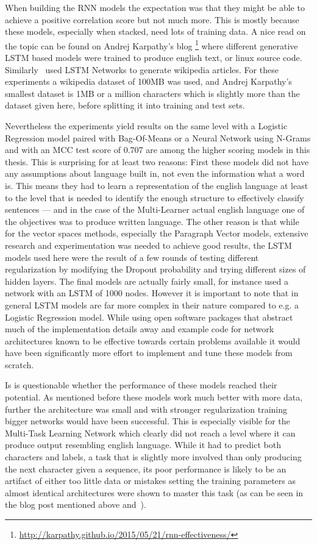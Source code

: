 When building the \gls{RNN} models the expectation was that they might be able to achieve a positive correlation score but not much more. This is mostly because these models, especially when stacked, need lots of training data. A nice read on the topic can be found on Andrej Karpathy's blog \footnote{\url{http://karpathy.github.io/2015/05/21/rnn-effectiveness/}} where different generative LSTM based models were trained to produce english text, or linux source code. Similarly~\cite{Graves:2013aa} used LSTM Networks to generate wikipedia articles. For these experiments a wikipedia dataset of 100MB was used, and Andrej Karpathy's smallest dataset is 1MB or a million characters which is slightly more than the dataset given here, before splitting it into training and test sets.

Nevertheless the experiments yield results on the same level with a Logistic Regression model paired with Bag-Of-Means or a Neural Network using N-Grams and  with an \gls{MCC} test score of 0.707 are among the higher scoring models in this thesis. This is surprising for at least two reasons: First these models did not have any assumptions about language built in, not even the information what a word is. This means they had to learn a representation of the english language at least to the level that is needed to identify the enough structure to effectively classify sentences --- and in the case of the Multi-Learner actual english language one of the objectives was to produce written language.
The other reason is that while for the vector spaces methods, especially the Paragraph Vector models, extensive research and experimentation was needed to achieve good results, the LSTM models used here were the result of a few rounds of testing different regularization by modifying the Dropout probability and trying different sizes of hidden layers. The final models are actually fairly small, \cite{Graves:2013aa} for instance used a network with an LSTM of 1000 nodes. However it is important to note that in general LSTM models are far more complex in their nature compared to e.g. a Logistic Regression model. While using open software packages that abstract much of the implementation details away and example code for network architectures known to be effective towards certain problems available it would have been significantly more effort to implement and tune these models from scratch.

Is is questionable whether the performance of these models reached their potential. As mentioned before these models work much better with more data, further the architecture was small and with stronger regularization training bigger networks would have been successful. This is especially visible for the Multi-Task Learning Network which clearly did not reach a level where it can produce output resembling english language. While it had to predict both characters and labels, a task that is slightly more involved than only producing the next character given a sequence, its poor performance is likely to be an artifact of either too little data or mistakes setting the training parameters as almost identical architectures were shown to master this task (as can be seen in the blog post mentioned above and~\cite{Graves:2013aa}).

